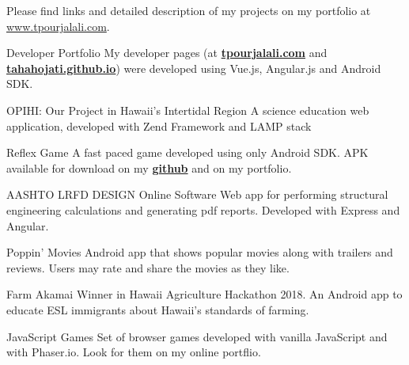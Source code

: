 
	Please find links and detailed description of my projects on my portfolio at \mbox{\href{http://www.tpourjalali.com}{www.tpourjalali.com}}.
\begin{cventries}
	
	\cventry
	{\faLaptop\faAndroid\enspace Developer Portfolio}
	{}
	{}
	{}
	{My developer pages (at \textbf{\href{http://www.tpourjalali.com}{tpourjalali.com}} and \textbf{\href{https://tahahojati.github.io}{ tahahojati.github.io}}) were developed using Vue.js, Angular.js and Android SDK.}

	\cventry
	{\faLaptop \enspace OPIHI: Our Project in Hawaii's Intertidal Region}
	{}
	{}
	{}
	{A science education web application, developed with Zend Framework and LAMP stack}
	
	\cventry
	{\faAndroid\enspace Reflex Game}
	{}
	{}
	{}
	{A fast paced game developed using only Android SDK. APK available for download on my \textbf{\href{https://github.com/tahahojati/ReflexGame}{github}} and on my portfolio.}

	\cventry
	{\faLaptop\enspace AASHTO LRFD DESIGN Online Software}
	{}
	{}
	{}
	{Web app for performing structural engineering calculations and generating pdf reports. Developed with Express and Angular. }
	
	
	\cventry
	{\faAndroid\enspace Poppin' Movies}
	{}
	{}
	{}
	{Android app that shows popular movies along with trailers and reviews.  Users may rate and share the movies as they like. }
	

	
	
	\cventry
	{\faTrophy\faAndroid\enspace Farm Akamai}
	{}
	{}
	{}
	{Winner in Hawaii Agriculture Hackathon 2018. An Android app to educate ESL immigrants about Hawaii's standards of farming.}

	\cventry
	{\faChrome\enspace JavaScript Games}
	{}
	{}
	{}
	{Set of browser games developed with vanilla JavaScript and with Phaser.io. Look for them on my online portflio.}
	

\end{cventries}
